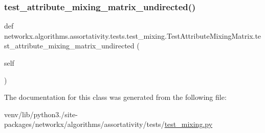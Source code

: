 \subsubsection{\texorpdfstring{test\+\_\+attribute\+\_\+mixing\+\_\+matrix\+\_\+undirected()}{test\_attribute\_mixing\_matrix\_undirected()}}
{\footnotesize\ttfamily def networkx.\+algorithms.\+assortativity.\+tests.\+test\+\_\+mixing.\+Test\+Attribute\+Mixing\+Matrix.\+test\+\_\+attribute\+\_\+mixing\+\_\+matrix\+\_\+undirected (\begin{DoxyParamCaption}\item[{}]{self }\end{DoxyParamCaption})}



The documentation for this class was generated from the following file\+:\begin{DoxyCompactItemize}
\item 
venv/lib/python3./site-\/packages/networkx/algorithms/assortativity/tests/\hyperlink{test__mixing_8py}{test\+\_\+mixing.\+py}\end{DoxyCompactItemize}
